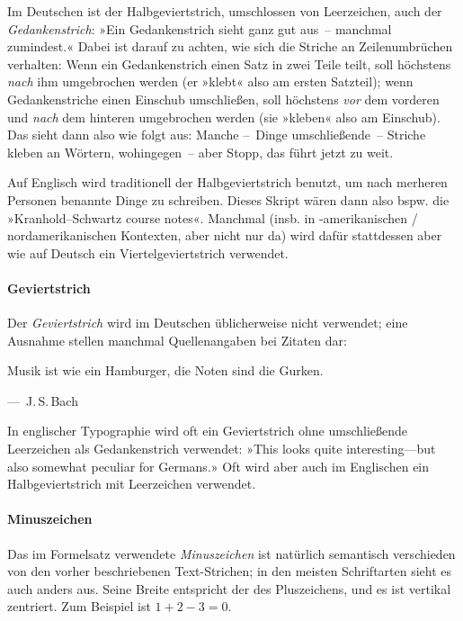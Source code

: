 Im Deutschen ist der Halbgeviertstrich, umschlossen von Leerzeichen,
auch der \emph{Gedankenstrich}: »Ein Gedankenstrich sieht ganz gut
aus~-- manchmal zumindest.«  Dabei ist darauf zu achten, wie sich die
Striche an Zeilenumbrüchen verhalten: Wenn ein Gedankenstrich einen
Satz in zwei Teile teilt, soll höchstens \emph{nach} ihm umgebrochen
werden (er »klebt« also am ersten Satzteil); wenn Gedankenstriche
einen Einschub umschließen, soll höchstens \emph{vor} dem vorderen und
\emph{nach} dem hinteren umgebrochen werden (sie »kleben« also am
Einschub).  Das sieht dann also wie folgt aus:  Manche --~Dinge
umschließende~-- Striche kleben an Wörtern, wohingegen~--
aber Stopp, das führt jetzt zu weit.

Auf Englisch wird traditionell der Halbgeviertstrich benutzt, um nach
merheren Personen benannte Dinge zu schreiben.  Dieses Skript wären
dann also bspw. die »\foreignlanguage{british}{Kranhold--Schwartz
  course notes}«.  Manchmal (insb. in -amerikanischen /
nordamerikanischen Kontexten, aber nicht nur da) wird dafür
stattdessen aber wie auf Deutsch ein Viertelgeviertstrich verwendet.

\paragraph{Geviertstrich}
Der \emph{Geviertstrich} \Char{---} wird im Deutschen üblicherweise
nicht verwendet; eine Ausnahme stellen manchmal Quellenangaben bei
Zitaten dar:
\begin{displayquote}
  Musik ist wie ein Hamburger, die Noten sind die \mbox{Gurken}.

  \quad---~J.\,S.\,Bach
\end{displayquote}

In englischer Typographie wird oft ein Geviertstrich ohne
umschließende Leerzeichen als Gedankenstrich verwendet:
»\foreignlanguage{british}{This looks quite interesting---but also
  somewhat peculiar for Germans.}»  Oft wird aber auch im Englischen
ein Halbgeviertstrich mit Leerzeichen verwendet.

\paragraph{Minuszeichen}
Das im Formelsatz verwendete \emph{Minuszeichen} \Char{$-$} ist
natürlich semantisch verschieden von den vorher beschriebenen
Text-Strichen; in den meisten Schriftarten sieht es auch anders aus.
Seine Breite entspricht der des Pluszeichens, und es ist vertikal
zentriert.  Zum Beispiel ist $1 + 2 - 3 = 0$.

